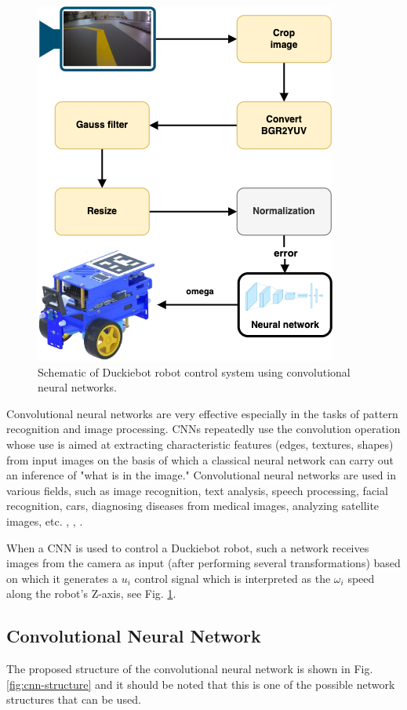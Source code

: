 \documentclass[conference]{IEEEtran}
\begin{document}
\begin{figure}[h]
    \centering
    \includegraphics[width=.8\columnwidth]{NNPipeline3}
    \caption{Schematic of Duckiebot robot control system using convolutional neural networks.}
    \label{fig:cnn-pipeline}
\end{figure}

Convolutional neural networks are very effective especially in the tasks of pattern recognition and image processing. CNNs repeatedly use the convolution operation whose use is aimed at extracting characteristic features (edges, textures, shapes) from input images on the basis of which a classical neural network can carry out an inference of "what is in the image." Convolutional neural networks are used in various fields, such as image recognition, text analysis, speech processing, facial recognition, cars, diagnosing diseases from medical images, analyzing satellite images, etc. \cite{li2021survey}, \cite{rawat2017deep}, \cite{almasi2020robust}.

When a CNN is used to control a Duckiebot robot, such a network receives images from the camera as input (after performing several transformations) based on which it generates a $u_i$ control signal which is interpreted as the $\omega_i$ speed along the robot's Z-axis, see Fig. \ref{fig:cnn-pipeline}.

\subsection{Convolutional Neural Network}
The proposed structure of the convolutional neural network is shown in Fig. \ref{fig:cnn-structure} and it should be noted that this is one of the possible network structures that can be used.
\end{document}
